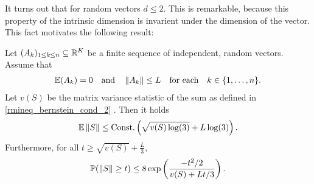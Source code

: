 It turns out that for random vectors $ d \le 2 $. This is remarkable, because this property of the intrinsic dimension is invarient under the dimension of the vector. This fact motivates the following result:
\begin{corollary}
  Let $(A_k)_{1\le k \le n}\subseteq\mathbb{R}^{K}$ be a finite sequence of independent, random vectors. Assume that
    \begin{gather}
      \label{rmineq_bernstein_cond_1}
      \mathbb{E}(A_k)=0\quad\text{and}\quad\left\lVert A_k\right\rVert\le L \quad \text{for each}\quad  k\in \{1,\ldots,n\}.
    \end{gather}
    Let $v(S)$ be the matrix variance statistic of the sum 
    as defined in
    \eqref{rmineq_bernstein_cond_2}
    .
  Then 
  it holds
      \begin{align}
        \label{rmineq_intrinsic_bernstein_expectation_bound}
        \mathbb{E}\left\lVert S\right\rVert\le \text{Const.}\left( \sqrt{v(S)\log(3)} + L\log(3) \right).
      \end{align}
    Furthermore, for all 
  $
    t
    \ge
    \sqrt{v(S)}
    +
    \frac{L}{3}
  $,
      \begin{gather}
        \label{rmineq_intrinsic_bernstein_probability_bound}
        \mathbb{P}(\left\lVert S\right\rVert\ge t)\le 8 \exp\left(\frac{-t^2/2}{v(S)+Lt/3} \right).
      \end{gather}
\end{corollary}
